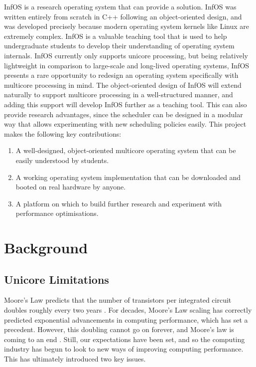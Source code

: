 \documentclass[bsc,frontabs,singlespacing,parskip,deptreport]{infthesis}
\begin{document}
InfOS \cite{infos} is a research operating system that can provide a solution. InfOS was written entirely from scratch in C++ following an object-oriented design, and was developed precisely because modern operating system kernels like Linux are extremely complex. InfOS is a valuable teaching tool that is used to help undergraduate students to develop their understanding of operating system internals. InfOS currently only supports unicore processing, but being relatively lightweight in comparison to large-scale and long-lived operating systems, InfOS presents a rare opportunity to redesign an operating system specifically with multicore processing in mind. The object-oriented design of InfOS will extend naturally to support multicore processing in a well-structured manner, and adding this support will develop InfOS further as a teaching tool. This can also provide research advantages, since the scheduler can be designed in a modular way that allows experimenting with new scheduling policies easily. This project makes the following key contributions:

\begin{enumerate}
    \item A well-designed, object-oriented multicore operating system that can be easily understood by students.
    \item A working operating system implementation that can be downloaded and booted on real hardware by anyone.
    \item A platform on which to build further research and experiment with performance optimisations.
\end{enumerate}

\chapter{Background}
\section{Unicore Limitations} \label{unicore-limitations}
Moore’s Law predicts that the number of transistors per integrated circuit doubles roughly every two years \cite{moore_1998, moore_2006}. For decades, Moore’s Law scaling has correctly predicted exponential advancements in computing performance, which has set a precedent. However, this doubling cannot go on forever, and Moore’s law is coming to an end \cite{DBLP:journals/cse/TheisW17}. Still, our expectations have been set, and so the computing industry has begun to look to new ways of improving computing performance. This has ultimately introduced two key issues.
\end{document}

